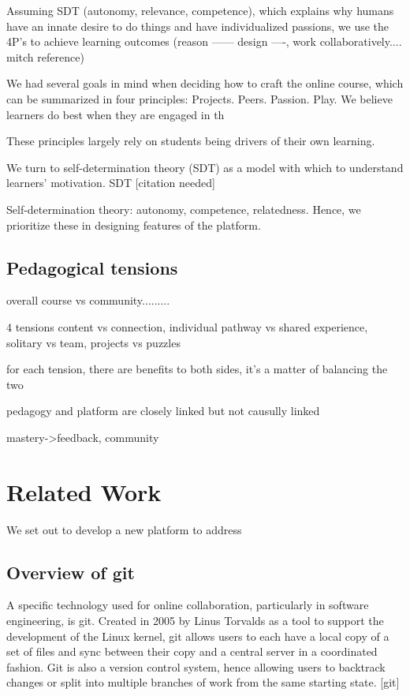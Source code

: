 \documentclass[12pt,twoside,vi]{mitthesis}
\newcommand{\wip}[1]{{\color{red} #1}}
\begin{document}
\wip{Assuming SDT (autonomy, relevance, competence), which explains why humans have an innate desire to do things and have individualized passions, we use the 4P's to achieve learning outcomes (reason ------ design ----, work collaboratively.... mitch reference)

We had several goals in mind when deciding how to craft the online course, which can be summarized in four principles: 
Projects. 
Peers. 
Passion. 
Play. 
We believe learners do best when they are engaged in th

These principles largely rely on students being drivers of their own learning. 

We turn to self-determination theory (SDT) as a model with which to understand learners’ motivation. SDT [citation needed]

Self-determination theory: autonomy, competence, relatedness. Hence, we prioritize these in designing features of the platform.
}

\section{Pedagogical tensions}

\wip{overall course vs community.........

4 tensions content vs connection, individual pathway vs shared experience, solitary vs team, projects vs puzzles

for each tension, there are benefits to both sides, it's a matter of balancing the two

pedagogy and platform are closely linked but not causully linked

mastery->feedback, community}

\chapter{Related Work}

We set out to develop a new platform to address 

\section{Overview of git}

A specific technology used for online collaboration, particularly in software engineering, is git. Created in 2005 by Linus Torvalds as a tool to support the development of the Linux kernel, git allows users to each have a local copy of a set of files and sync between their copy and a central server in a coordinated fashion. Git is also a version control system, hence allowing users to backtrack changes or split into multiple branches of work from the same starting state. [git]
\end{document}
